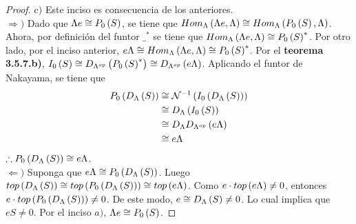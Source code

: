 \documentclass{article}
\begin{document}
\begin{enumerate}[label=\textbf{Ej \arabic*.}]
\begin{proof}
			$\boxed{\text{c)}}$ Este inciso es consecuencia de los anteriores.\\
			$\boxed{\Rightarrow )}$ Dado que $\Lambda e \cong P_{0}\left(S\right)$, se tiene que $Hom_{\Lambda}\left(\Lambda e,\Lambda\right)\cong Hom_{\Lambda}\left(P_{0}\left(S\right),\Lambda\right)$. Ahora, por definición del funtor $\_^{*}$ se tiene que $Hom_{\Lambda}\left(\Lambda e,\Lambda\right)\cong P_{0}\left(S\right)^{*}$. Por otro lado, por el inciso anterior, $e\Lambda\cong Hom_{\Lambda}\left(\Lambda e,\Lambda\right)\cong P_{0}\left(S\right)^{*}$. Por el \textbf{teorema 3.5.7.b)}, $I_{0}\left(S\right) \cong D_{{\Lambda}^{op}}\left(P_{0}\left(S\right)^{*}\right) \cong D_{{\Lambda}^{op}}\left(e\Lambda\right)$. Aplicando el funtor de Nakayama, se tiene que
			\begin{align*}
				P_{0}\left(D_{\Lambda}\left(S\right)\right)&\cong\mathcal{N}^{-1}\left(I_{0}\left(D_{\Lambda}\left(S\right)\right)\right)\\
				&\cong D_{\Lambda}\left(I_{0}\left(S\right)\right)\\
				&\cong D_{\Lambda}D_{{\Lambda}^{op}}\left(e\Lambda\right)\\
				&\cong e\Lambda
			\end{align*}
			$\therefore P_{0}\left(D_{\Lambda}\left(S\right)\right) \cong e\Lambda$.\\
		
			$\boxed{\Leftarrow )}$ Suponga que $e\Lambda \cong P_{0}\left(D_{\Lambda}\left(S\right)\right)$. Luego $top\left(D_{\Lambda}\left(S\right)\right) \cong top\left(P_{0}\left(D_{\Lambda}\left(S\right)\right)\right) \cong top\left(e\Lambda\right)$. Como $e \cdot top\left(e\Lambda\right) \neq 0$, entonces $e \cdot top\left(P_{0}\left(D_{\Lambda}\left(S\right)\right)\right) \neq 0$. De este modo, $e \cong D_{\Lambda}\left(S\right) \neq 0$. Lo cual implica que $eS \neq 0$. Por el inciso $a)$, $\Lambda e \cong P_{0}\left(S\right)$.
		\end{proof}
	\end{enumerate}
\end{document}
